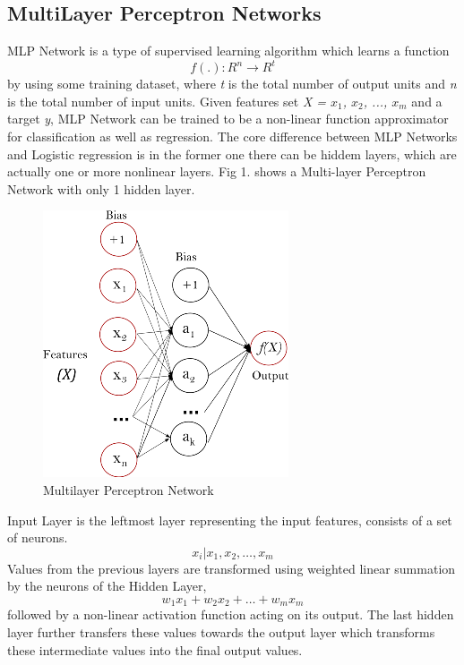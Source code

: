 \documentclass[a4paper, 10pt, conference]{IEEEtran}
\begin{document}
\subsection{MultiLayer Perceptron Networks}
MLP Network is a type of supervised learning algorithm which learns a function \[ f(.): R^{n} \rightarrow R^{t} \] by using some training dataset, where \textit{t} is the total number of output units and \textit{n} is the total number of input units. Given features set \textit{X = $x_{1}$, $x_{2}$, ..., $x_{m}$} and a target \textit{y},  MLP Network can be trained to be a non-linear function approximator for classification as well as regression. The core difference between MLP Networks and Logistic regression is in the former one there can be hiddem layers, which are actually one or more nonlinear layers. Fig 1. shows a Multi-layer Perceptron Network with only 1 hidden layer.
\begin{figure}
  \includegraphics[width=\linewidth]{MLP.png}
  \caption{Multilayer Perceptron Network}
  \label{fig:mlp}
\end{figure}

Input Layer is the leftmost layer representing the input features, consists of a set of neurons. \[ {x_{i}|x_{1},x_{2},\ldots,x_{m}} \]Values from the previous layers are transformed using weighted linear summation by the neurons of the Hidden Layer, \[ w_{1}x_{1} + w_{2}x_{2} + \ldots + w_{m}x_{m} \]
followed by a non-linear activation function acting on its output. The last hidden layer further transfers these values towards the output layer which transforms these intermediate values into the final output values.
\end{document}
